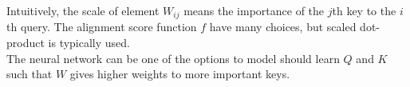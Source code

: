 Intuitively, the scale of element $W_{ij}$ means the importance of the $j$th key
to the $i$th query. The alignment score function $f$ have many choices, but
scaled dot-product is typically used. \\
The neural network can be one of the options to model should learn $Q$ and $K$ such that $W$ gives higher weights to more important keys.




